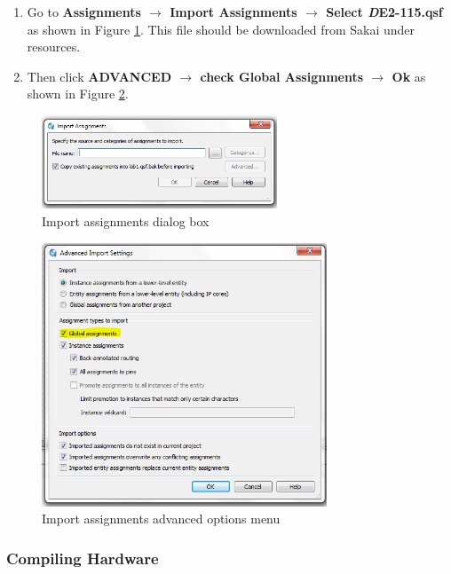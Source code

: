  \begin{enumerate}  
 
	\item Go to {\bf Assignments $\rightarrow$  Import Assignments $\rightarrow$  Select \emph DE2-115.qsf} as shown in Figure \ref{fig:importassign}. This file should be downloaded from Sakai under resources. 
	
	\item Then click {\bf ADVANCED $\rightarrow$ check Global Assignments $\rightarrow$ Ok} as shown in Figure \ref{fig:advancedimport}.

\end{enumerate}

\begin{figure}[H]
	\centering
	\includegraphics[width=70mm]{Lab1/figures/importassign.png}
	\caption{Import assignments dialog box}
	\label{fig:importassign}
\end{figure}

\begin{figure}[H]
	\centering
	\includegraphics[width=85mm]{Lab1/figures/advancedimport.png}
	\caption{Import assignments advanced options menu}
	\label{fig:advancedimport}
\end{figure}

\subsubsection{Compiling Hardware}

